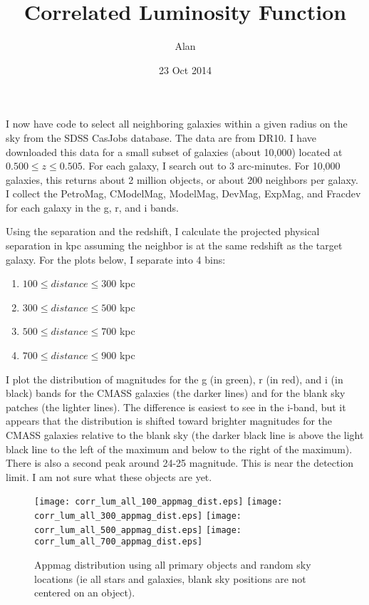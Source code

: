 \documentclass[10pt]{article}
\title{Correlated Luminosity Function}
\author{Alan}
\date{23 Oct 2014}
\begin{document}
\maketitle

I now have code to select all neighboring galaxies within a given radius on the sky from the SDSS CasJobs database. The data are from DR10.
I have downloaded this data for a small subset of galaxies (about 10,000) located at $0.500\leq z \leq 0.505$. For each galaxy, I search out to 
3 arc-minutes. For 10,000 galaxies, this returns about 2 million objects, or about 200 neighbors per galaxy. I collect the PetroMag, CModelMag, ModelMag, 
DevMag, ExpMag, and Fracdev for each galaxy in the g, r, and i bands.

Using the separation and the redshift, I calculate the projected physical separation in kpc assuming the neighbor is at the same redshift as the target 
galaxy. For the plots below, I separate into 4 bins: 
\begin{enumerate}
 \item $100\leq distance \leq 300$ kpc
 \item $300\leq distance \leq 500$ kpc
 \item $500\leq distance \leq 700$ kpc
 \item $700\leq distance \leq 900$ kpc
\end{enumerate}
I plot the distribution of magnitudes for the g (in green), r (in red), and i (in black) bands for the CMASS galaxies (the darker lines) and for the blank
sky patches (the lighter lines). The difference is easiest to see in the i-band, but it appears that the distribution is shifted toward brighter magnitudes
for the CMASS galaxies relative to the blank sky (the darker black line is above the light black line to the left of the maximum and below to the right 
of the maximum). There is also a second peak around 24-25 magnitude. This is near the detection limit. I am not sure what these objects are yet.


\begin{figure}
 \texttt{[image: corr\_lum\_all\_100\_appmag\_dist.eps]}
 \texttt{[image: corr\_lum\_all\_300\_appmag\_dist.eps]}
 \texttt{[image: corr\_lum\_all\_500\_appmag\_dist.eps]}
 \texttt{[image: corr\_lum\_all\_700\_appmag\_dist.eps]}
\caption{Appmag distribution using all primary objects and random sky locations 
(ie all stars and galaxies, blank sky positions are not centered on an object).}
\end{figure}
\end{document}
